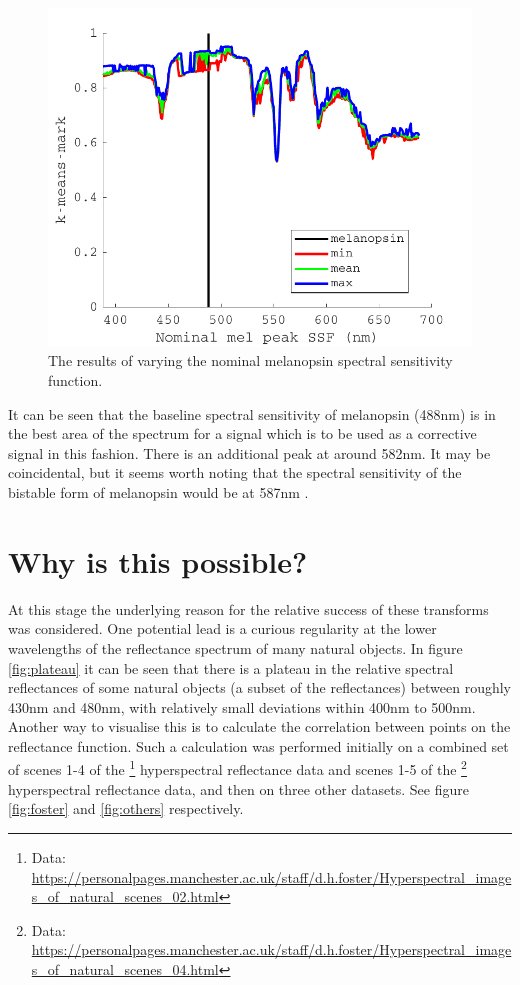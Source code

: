 \begin{figure}[htbp]
 \includegraphics[max width=\textwidth]{figs/comp/optimality_caller/optimality.pdf}
 \caption{The results of varying the nominal melanopsin spectral sensitivity function.}
 \label{fig:optimality}
\end{figure} 

It can be seen that the baseline spectral sensitivity of melanopsin (488nm) is in the best area of the spectrum for a signal which is to be used as a corrective signal in this fashion. There is an additional peak at around 582nm. It may be coincidental, but it seems worth noting that the spectral sensitivity of the bistable form of melanopsin would be at 587nm \citep{mure_melanopsin_2009}.



\section{Why is this possible?}


At this stage the underlying reason for the relative success of these transforms was considered. One potential lead is a curious regularity at the lower wavelengths of the reflectance spectrum of many natural objects. In figure \ref{fig:plateau} it can be seen that there is a plateau in the relative spectral reflectances of some natural objects (a subset of the \citet{vrhel_measurement_1994} reflectances) between roughly 430nm and 480nm, with relatively small deviations within 400nm to 500nm. Another way to visualise this is to calculate the correlation between points on the reflectance function. Such a calculation was performed initially on a combined set of scenes 1-4 of the
\citet{nascimento_statistics_2002}\footnote{Data: \url{https://personalpages.manchester.ac.uk/staff/d.h.foster/Hyperspectral_images_of_natural_scenes_02.html}} hyperspectral reflectance data and
scenes 1-5 of the 
\citet{foster_frequency_2006}\footnote{Data: \url{https://personalpages.manchester.ac.uk/staff/d.h.foster/Hyperspectral_images_of_natural_scenes_04.html}}
hyperspectral reflectance data, and then on three other datasets. See figure \ref{fig:foster} and \ref{fig:others} respectively.

